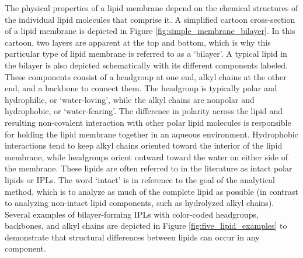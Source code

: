 The physical properties of a lipid membrane depend on the chemical structures of the individual lipid molecules that comprise it. A simplified cartoon cross-section of a lipid membrane is depicted in Figure \ref{fig:simple_membrane_bilayer}.
In this cartoon, two layers are apparent at the top and bottom, which is why this particular type of lipid membrane is referred to as a `bilayer'. A typical lipid in the bilayer is also depicted schematically with its different components labeled. These components consist of a headgroup at one end, alkyl chains at the other end, and a backbone to connect them. The headgroup is typically polar and hydrophilic, or `water-loving', while the alkyl chains are nonpolar and hydrophobic, or `water-fearing'. The difference in polarity across the lipid and resulting non-covalent interaction with other polar lipid molecules is responsible for holding the lipid membrane together in an aqueous environment. Hydrophobic interactions tend to keep alkyl chains oriented toward the interior of the lipid membrane, while headgroups orient outward toward the water on either side of the membrane. These lipids are often referred to in the literature as intact polar lipids or IPLs. The word `intact' is in reference to the goal of the analytical method, which is to analyze as much of the complete lipid as possible (in contrast to analyzing non-intact lipid components, such as hydrolyzed alkyl chains). Several examples of bilayer-forming IPLs with color-coded headgroups, backbones, and alkyl chains are depicted in Figure \ref{fig:five_lipid_examples} to demonstrate that structural differences between lipids can occur in any component.
